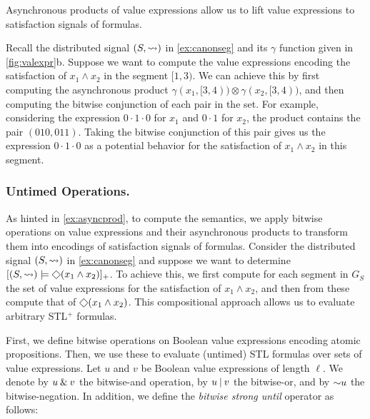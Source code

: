 Asynchronous products of value expressions allow us to lift value expressions to satisfaction signals of formulas.

\begin{example} \label{ex:asyncprod}
	Recall the distributed signal $(S, {\rightsquigarrow})$ in \cref{ex:canonseg} and its $\gamma$ function given in \cref{fig:valexpr}b.
	Suppose we want to compute the value expressions encoding the satisfaction of $x_1 \land x_2$ in the segment $[1,3)$.
	We can achieve this by first computing the asynchronous product $\gamma(x_1, [3,4)) \otimes \gamma(x_2, [3,4))$, and then computing the bitwise conjunction of each pair in the set.
	For example, considering the expression $0 \cdot 1 \cdot 0$ for $x_1$ and $0 \cdot 1$ for $x_2$, the product contains the pair $(010, 011)$.
	Taking the bitwise conjunction of this pair gives us the expression $0 \cdot 1 \cdot 0$ as a potential behavior for the satisfaction of $x_1 \land x_2$ in this segment.
\end{example}

\subsubsection{Untimed Operations.}
As hinted in \cref{ex:asyncprod}, to compute the semantics, we apply bitwise operations on value expressions and their asynchronous products to transform them into encodings of satisfaction signals of formulas.
Consider the distributed signal $(S, {\rightsquigarrow})$ in \cref{ex:canonseg} and suppose we want to determine 
$[(S, {\hb}) \models \LTLeventually (x_1 \land x_2)]_+$.
To achieve this, we first compute for each segment in $G_S$ the set of value expressions for the satisfaction of $x_1 \land x_2$, and then from these compute that of $\LTLeventually (x_1 \land x_2)$.
This compositional approach allows us to evaluate arbitrary STL$^+$ formulas.

First, we define bitwise operations on Boolean value expressions encoding atomic propositions.
Then, we use these to evaluate (untimed) STL formulas over sets of value expressions.
%
Let $u$ and $v$ be Boolean value expressions of length $\ell$.
We denote by $u \mathbin{\&} v$ the bitwise-and operation, by $u \mathbin{|} v$ the bitwise-or, and by $\mathord{\sim} u$ the bitwise-negation.
In addition, we define the \emph{bitwise strong until} operator as follows:

